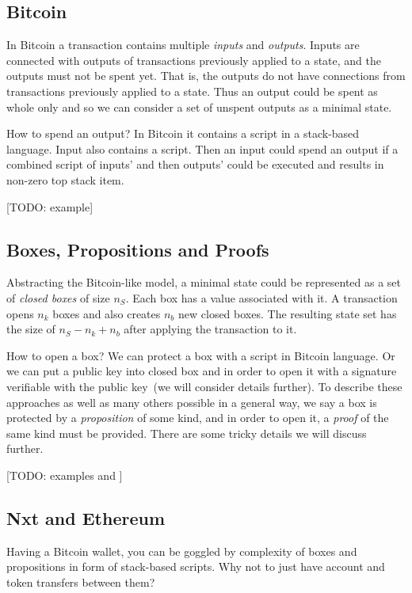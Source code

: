 \documentclass[]{report}   %
\begin{document}
\subsection{Bitcoin}

In Bitcoin a transaction contains multiple \textit{inputs} and \textit{outputs}. Inputs are connected with outputs of transactions previously applied to a state, and the outputs must not be spent yet. That is, the outputs do not have connections from transactions previously 
applied to a state. Thus an output could be spent as whole only and so we can consider a set of unspent outputs as a minimal state.

How to spend an output? In Bitcoin it contains a script in a stack-based language. Input also contains a script. Then an input could spend an output if a combined script of inputs' and then outputs' could be executed and results in non-zero top stack item.

[TODO: example]

\subsection{Boxes, Propositions and Proofs}

Abstracting the Bitcoin-like model, a minimal state could be represented as a set of \textit{closed boxes} of size \(n_S\). Each box has a value associated with it. A transaction opens \(n_k\) boxes and also creates \(n_b\) new closed boxes. The resulting state set has the size of \(n_S-n_k+n_b\) after applying the transaction to it. 

How to open a box? We can protect a box with a script in Bitcoin language. Or we can put a public key into closed box and in order to open it with a signature verifiable with the public key~(we will consider details further). To describe these approaches as well as many others possible in a general way, we say a box is protected by a \textit{proposition} of some kind, and in order to open it, a \textit{proof} of the same kind must be provided. There are some tricky details we will discuss further.

[TODO: examples and ]

\subsection{Nxt and Ethereum}	

Having a Bitcoin wallet, you can be goggled by complexity of boxes and propositions in form of stack-based scripts. Why not to just have account and token transfers between them? 
\end{document}

